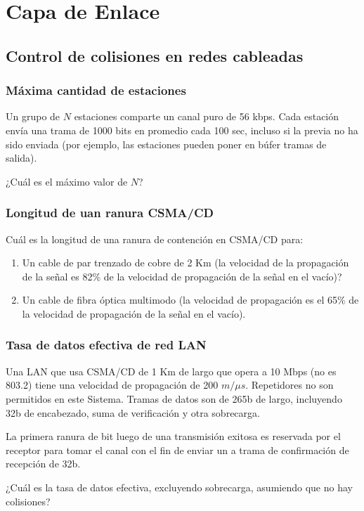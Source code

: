 \documentclass[12pt]{report}
\begin{document}
%
%


\chapter{Capa de Enlace}
\begin{exer}
\section{Control de colisiones en redes cableadas}
\subsection{Máxima cantidad de estaciones \sthree}
Un grupo de $N$ estaciones comparte un canal  puro de 56 kbps. Cada estación envía una trama de 1000 bits en promedio cada 100 sec, incluso si la previa no ha sido enviada (por ejemplo, las estaciones pueden poner en búfer tramas de salida).

¿Cuál es el máximo valor de $N$?
\end{exer}

\begin{exer}
\subsection{Longitud de uan ranura CSMA/CD \sthree}
Cuál es la longitud de una ranura de contención en CSMA/CD para:

\begin{enumerate}
\item Un cable de par trenzado de cobre de 2 Km (la velocidad de la propagación de la señal es 82\% de la velocidad de propagación de la señal en el vacío)?
\item Un cable de fibra óptica multimodo (la velocidad de propagación es el 65\% de la velocidad de propagación de la señal en el vacío).
\end{enumerate}
\end{exer}

\begin{exer}
\subsection{Tasa de datos efectiva de red LAN \sthree}
Una LAN que usa CSMA/CD de 1 Km de largo que opera a 10 Mbps (no es 803.2)
tiene una velocidad de propagación de 200 $m/\mu s$. Repetidores no son permitidos en este
Sistema. Tramas de datos son de 265b de largo, incluyendo 32b de encabezado, suma de
verificación y otra sobrecarga.

La primera ranura de bit luego de una transmisión exitosa es reservada por el receptor para tomar el canal con el fin de enviar un a trama de confirmación de recepción de 32b.

¿Cuál es la tasa de datos efectiva, excluyendo sobrecarga, asumiendo que no hay colisiones?
\end{exer}
\end{document}
